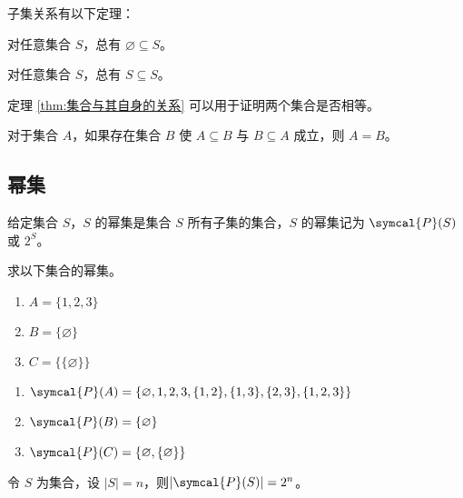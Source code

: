 子集关系有以下定理：
\begin{theorem}\label{thm:集合与空集之间的关系}
    对任意集合 $S$，总有 $\varnothing \subseteq S$。
\end{theorem}

\begin{theorem}\label{thm:集合与其自身的关系}
    对任意集合 $S$，总有 $S \subseteq S$。
\end{theorem}

定理 \ref{thm:集合与其自身的关系} 可以用于证明两个集合是否相等。
\begin{theorem}\label{thm:证明集合相等}
    对于集合 $A$，如果存在集合 $B$ 使 $A \subseteq B$ 与 $B \subseteq A$ 成立，则 $A = B$。
\end{theorem}

\subsection{幂集}
\begin{definition}[幂集的定义]\label{def:幂集的定义}
    给定集合 $S$，$S$ 的幂集是集合 $S$ 所有子集的集合，$S$ 的幂集记为 $\symcal{P}(S)$ 或 $2^S$。
\end{definition}

\begin{collections}
    \begin{example}
        求以下集合的幂集。
        \begin{enumerate}
            \item $A = \{1, 2, 3\}$
            \item $B = \{ \varnothing \}$
            \item $C = \{\{ \varnothing \}\}$
        \end{enumerate}
    \end{example}
    \begin{solution}
        \begin{enumerate}
            \item $\symcal{P}(A) = \{\varnothing, 1, 2, 3, \{1, 2\}, \{1, 3\}, \{2, 3\}, \{1, 2, 3\}\}$
            \item $\symcal{P}(B) = \{\varnothing\}$
            \item $\symcal{P}(C) = \{\varnothing, \{\varnothing\}\}$
        \end{enumerate}
    \end{solution}
\end{collections}

\begin{theorem}
    令 $S$ 为集合，设 $|S| = n$，则$|\symcal{P}(S)| = 2^n$。
\end{theorem}

